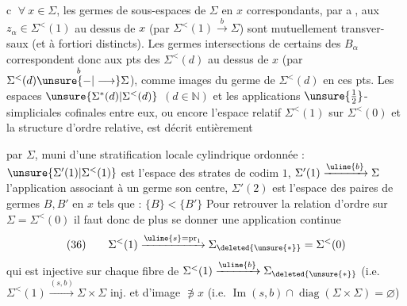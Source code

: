 \textcircled{c} $\forall\ x\in\Sigma$, les germes  de sous-espaces  de $\Sigma$ en $x$
correspondants, par \textcircled{a}, aux $z_\alpha\in\Sigma^{<}(1)$ au dessus
de $x$ (par $\Sigma^{<}(1)\xrightarrow{b}\Sigma$) sont mutuellement transver-
saux (et à fortiori distincts).
Les germes intersections de certains des $B_\alpha$
correspondent donc aux pts des $\Sigma^{<}(d)$ au dessus
de $x$ (par $\Sigma^{<}(d)\overset{b}{\unsure{-|\longrightarrow}}\Sigma$), comme
images du  germe de $\Sigma^{<}(d)$ en ces pts.
Les espaces $\unsure{\Sigma^{*}(d)|\Sigma^{<}(d)}$ $(d\in\mathbb N)$ et les
applications $\unsure{\tfrac12}$-simpliciales cofinales entre eux, 
ou encore l'espace relatif $\Sigma^{<}(1)$ sur $\Sigma^{<}(0)$ et la
structure d'ordre relative, est décrit entièrement

par $\Sigma$, muni d'une stratification locale
cylindrique ordonnée : $\unsure{\Sigma'(1)|\Sigma^{<}(1)}$ est l'espace des
strates de codim $1$, $\Sigma'(1)\xrightarrow{\uline{b}}\Sigma$ l'application
associant à un germe son centre, $\Sigma'(2)$ est
l'espace des paires de germes $B,B'$ en $x$
 tels que : $\{B\}<\{B'\}$ 
Pour retrouver la relation d'ordre sur $\Sigma=\Sigma^{<}(0)$
il faut donc de plus se donner une application
continue
\[
(36)\qquad\Sigma^{<}(1)\xrightarrow{\uline{s}=\operatorname{pr}_1}\Sigma_{\deleted{\unsure{*}}}=\Sigma^{<}(0)
\]
qui est injective  sur chaque fibre 
de $\Sigma^{<}(1)\xrightarrow{\uline{b}}\Sigma_{\deleted{\unsure{*}}}$ (i.e. $\Sigma^{<}(1)\xrightarrow{(s,b)}\Sigma\times\Sigma$ inj.
et d'image $\not\ni x$ (i.e. $\operatorname{Im}(s,b)\cap\operatorname{diag}(\Sigma\times\Sigma)=\varnothing$)

